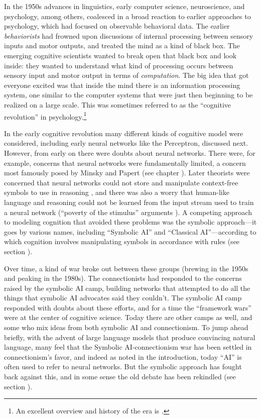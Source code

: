 In the 1950s advances in linguistics, early computer science, neuroscience, and psychology, among others, coalesced in a broad reaction to earlier approaches to psychology, which had focused on observable behavioral data. The earlier \emph{behaviorists} had frowned upon discussions of internal processing between sensory inputs and motor outputs, and treated the mind as a kind of black box. The emerging cognitive scientists wanted to break open that black box and look inside: they wanted to understand what kind of processing occurs between sensory input and motor output in terms of \emph{computation}. The big idea that got everyone excited was that inside the mind there is an information processing system, one similar to the computer systems that were just then beginning to be realized on a large scale. This was sometimes referred to as the ``cognitive revolution'' in psychology.\footnote{An excellent overview and history of the era is \cite{baars1986cognitive}.}  

In the early cognitive revolution many different kinds of cognitive model were considered, including early neural networks like the Perceptron, discussed next. However, from early on there were doubts about neural networks. There were, for example, concerns that neural networks were fundamentally limited, a concern most famously posed by Minsky and Papert (see chapter ). Later theorists were concerned that neural networks could not store and manipulate context-free symbols to use in reasoning \cite{fodor1988connectionism}, and there was also a worry that human-like language and reasoning could not be learned from the input stream used to train a neural network (``poverty of the stimulus'' arguments \cite{berwick2011poverty}). A competing approach to modeling cognition that avoided these problems was the symbolic approach---it goes by various names, including ``Symbolic AI'' and ``Classical AI''---according to which cognition involves manipulating symbols in accordance with rules (see section ).

Over time, a kind of war broke out between these groups (brewing in the 1950s and peaking in the 1980s).  The connectionists had responded to the concerns raised by the symbolic AI camp, building networks that attempted to do all the things that symbolic AI advocates said they couldn't. The symbolic AI camp responded with doubts about these efforts, and for a time the ``framework wars'' were at the center of cognitive science. Today there are other camps as well, and some who mix ideas from both symbolic AI and connectionism. To jump ahead briefly, with the advent of large language models that produce convincing natural language, many feel that the Symbolic AI-connectionism war has been settled in connectionism's favor, and indeed  as noted in the introduction, today ``AI'' is often used to refer to neural networks. But the symbolic approach has fought back against this, and in some sense the old debate has been rekindled (see section ).

